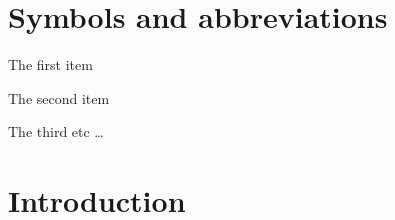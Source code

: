 \documentclass[dissertation]{aaltoseries}
\newcommand{\listofsymbols}{%
  \chapter*{Symbols and abbreviations}%
}
\begin{document}

\tableofcontents

\listofpublications


\listofsymbols
{}

\begin{description} \itemsep2pt
  \item[First] The first item
  \item[$\int$ Second] The second item
  \item[Third] The third etc \ldots
\end{description}

\chapter{Introduction}
\setcounter{page}{1}




% 

%
%






\end{document}
